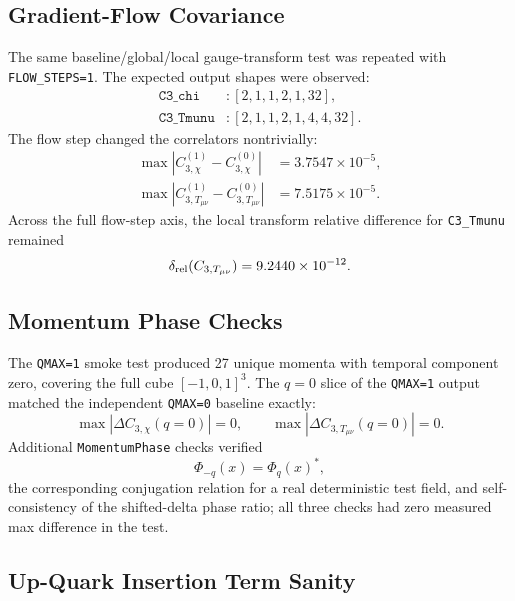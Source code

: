 \documentclass[11pt,a4paper]{article}
\begin{document}
\subsection{Gradient-Flow Covariance}

The same baseline/global/local gauge-transform test was repeated with
\texttt{FLOW\_STEPS=1}.  The expected output shapes were observed:
\begin{align}
  \texttt{C3\_chi} &: [2,1,1,2,1,32],\\
  \texttt{C3\_Tmunu} &: [2,1,1,2,1,4,4,32].
\end{align}
The flow step changed the correlators nontrivially:
\begin{align}
  \max|C_{3,\chi}^{(1)} - C_{3,\chi}^{(0)}|
    &= 3.7547\times 10^{-5},\\
  \max|C_{3,T_{\mu\nu}}^{(1)} - C_{3,T_{\mu\nu}}^{(0)}|
    &= 7.5175\times 10^{-5}.
\end{align}
Across the full flow-step axis, the local transform relative difference for
\texttt{C3\_Tmunu} remained
\begin{equation}
  \delta_{\rm rel}(C_{3,T_{\mu\nu}}) = 9.2440\times 10^{-12}.
\end{equation}

\subsection{Momentum Phase Checks}

The \texttt{QMAX=1} smoke test produced 27 unique momenta with temporal component
zero, covering the full cube $[-1,0,1]^{3}$.  The $q=0$ slice of the \texttt{QMAX=1}
output matched the independent \texttt{QMAX=0} baseline exactly:
\begin{equation}
  \max |\Delta C_{3,\chi}(q=0)| = 0,\qquad
  \max |\Delta C_{3,T_{\mu\nu}}(q=0)| = 0.
\end{equation}
Additional \texttt{MomentumPhase} checks verified
\begin{equation}
  \Phi_{-q}(x) = \Phi_{q}(x)^{*},
\end{equation}
the corresponding conjugation relation for a real deterministic test field, and
self-consistency of the shifted-delta phase ratio; all three checks had zero
measured max difference in the test.

\subsection{Up-Quark Insertion Term Sanity}
\end{document}
